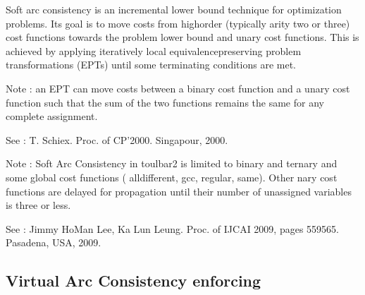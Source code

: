 \documentclass[letterpaper,10pt,openany,oneside,english]{sphinxmanual}
\begin{document}
\begin{fulllineitems}

\pysigstartsignatures
{}
\pysigstopsignatures
\sphinxAtStartPar
Soft arc consistency is an incremental lower bound technique for optimization problems. Its goal is to move costs from high\sphinxhyphen{}order (typically arity two or three) cost functions towards the problem lower bound and unary cost functions. This is achieved by applying iteratively local equivalence\sphinxhyphen{}preserving problem transformations (EPTs) until some terminating conditions are met.

\sphinxAtStartPar
Note :  an EPT can move costs between a binary cost function and a unary cost function such that the sum of the two functions remains the same for any complete assignment.

\sphinxAtStartPar
See :  T. Schiex. Proc. of CP’2000. Singapour, 2000.

\sphinxAtStartPar
Note : Soft Arc Consistency in toulbar2 is limited to binary and ternary and some global cost functions ( alldifferent, gcc, regular, same). Other n\sphinxhyphen{}ary cost functions are delayed for propagation until their number of unassigned variables is three or less.

\sphinxAtStartPar
See :  Jimmy Ho\sphinxhyphen{}Man Lee, Ka Lun Leung. Proc. of IJCAI 2009, pages 559\sphinxhyphen{}565. Pasadena, USA, 2009. 

\end{fulllineitems}



\subsection{Virtual Arc Consistency enforcing}
\label{\detokenize{ref/ref_modules:virtual-arc-consistency-enforcing}}
\end{document}
